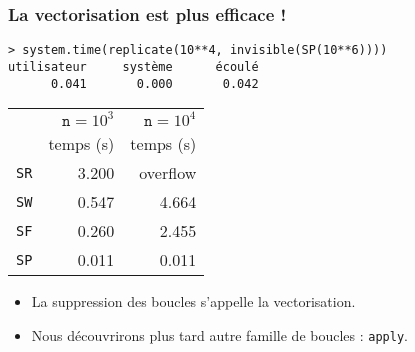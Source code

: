 \documentclass[10pt]{beamer}
\begin{document}
\begin{frame}[fragile]
  \frametitle{La vectorisation est plus efficace !}

\begin{lstlisting}
> system.time(replicate(10**4, invisible(SP(10**6))))
utilisateur     système      écoulé
      0.041       0.000       0.042
\end{lstlisting}


\begin{table}[h]
  \centering
  \begin{tabular}{lrr}
    \toprule
                & $\mathtt{n}=10^3$ & $\mathtt{n}=10^4$ \\
                & temps (s)         & temps (s)         \\
    \midrule
    \texttt{SR} & 3.200             & overflow          \\
    \texttt{SW} & 0.547             & 4.664             \\
    \texttt{SF} & 0.260             & 2.455             \\
    \texttt{SP} & 0.011             & 0.011             \\
    \bottomrule
  \end{tabular}
\end{table}

\begin{itemize}
\item<alert@1> La suppression des boucles s’appelle la vectorisation.
\item Nous découvrirons plus tard autre famille de boucles : \texttt{apply}.
\end{itemize}

\end{frame}





 \questionSlide

 \appendix
 \backupSlides







\end{document}
